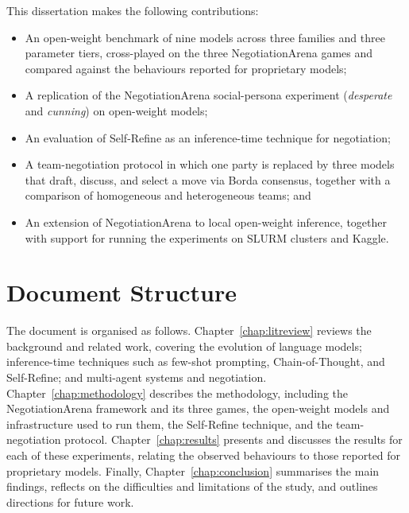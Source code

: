 This dissertation makes the following contributions:
\begin{itemize}
    \item An open-weight benchmark of nine models across three families and three parameter tiers, cross-played on the three NegotiationArena games and compared against the behaviours reported for proprietary models;
    \item A replication of the NegotiationArena social-persona experiment (\textit{desperate} and \textit{cunning}) on open-weight models;
    \item An evaluation of Self-Refine as an inference-time technique for negotiation;
    \item A team-negotiation protocol in which one party is replaced by three models that draft, discuss, and select a move via Borda consensus, together with a comparison of homogeneous and heterogeneous teams; and
    \item An extension of NegotiationArena to local open-weight inference, together with support for running the experiments on SLURM clusters and Kaggle.
\end{itemize}

\section{Document Structure}

The document is organised as follows. Chapter~\ref{chap:litreview} reviews the background and related work, covering the evolution of language models; inference-time techniques such as few-shot prompting, Chain-of-Thought, and Self-Refine; and multi-agent systems and negotiation. Chapter~\ref{chap:methodology} describes the methodology, including the NegotiationArena framework and its three games, the open-weight models and infrastructure used to run them, the Self-Refine technique, and the team-negotiation protocol. Chapter~\ref{chap:results} presents and discusses the results for each of these experiments, relating the observed behaviours to those reported for proprietary models. Finally, Chapter~\ref{chap:conclusion} summarises the main findings, reflects on the difficulties and limitations of the study, and outlines directions for future work.